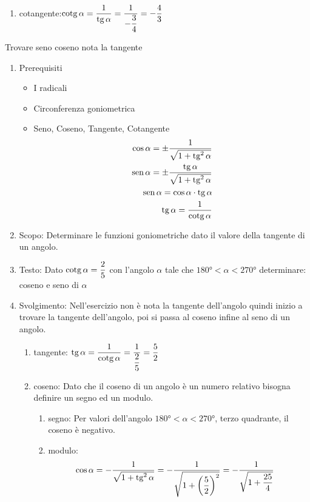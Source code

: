 {\begin{table}[H]
\begin{enumerate}
\begin{enumerate}
  \item cotangente:$\operatorname{cotg}\alpha=\dfrac{1}{\operatorname{tg}\alpha}=\dfrac{1}{-\dfrac{3}{4}}=-\dfrac{4}{3}$
\end{enumerate}
 \end{enumerate}
\end{table}
\begin{table}[H]
	\caption{Trovare seno coseno nota la tangente}
	\label{tab:sommadifangoli}
	\begin{enumerate}
		\item Prerequisiti 
		\begin{itemize}
			\item I radicali
			\item Circonferenza goniometrica
			\item Seno, Coseno, Tangente, Cotangente
			\begin {align*}
			\cos\alpha=\pm\dfrac{1}{\sqrt{1+\operatorname{tg}^2\alpha}}\\
			\operatorname{sen}\alpha=\pm\dfrac{\operatorname{tg}\alpha}{\sqrt{1+\operatorname{tg}^2\alpha}}\\
			\operatorname{sen}\alpha=\cos\alpha\cdot\operatorname{tg}\alpha\\
			\operatorname{tg}\alpha=\dfrac{1}{\operatorname{cotg}\alpha}
		\end{align*}
	\end{itemize}
	\item Scopo: Determinare le funzioni goniometriche dato il valore della tangente di un angolo.
	\item Testo: Dato $\operatorname{cotg}\alpha=\dfrac{2}{5}$ con l'angolo $\alpha$ tale che $\ang{180}<\alpha<\ang{270}$ determinare: coseno e seno di $\alpha$
	\item Svolgimento: Nell'esercizio non è nota la tangente dell'angolo quindi inizio a trovare la tangente dell'angolo, poi si passa al coseno infine al seno di un angolo.
	\begin{enumerate}
		\item tangente: $\operatorname{tg}\alpha=\dfrac{1}{\operatorname{cotg}\alpha}=\dfrac{1}{\dfrac{2}{5}}=\dfrac{5}{2}$
		\item coseno: Dato che il coseno di un angolo è un numero relativo bisogna definire un segno ed un modulo.
		\begin{enumerate}
			\item segno: Per valori dell'angolo  $\ang{180}<\alpha<\ang{270}$, terzo quadrante, il coseno è negativo. 
			\item modulo:
			\begin{align*}
			\cos\alpha&=-\dfrac{1}{\sqrt{1+\tg^2\alpha}}
			=-\dfrac{1}{\sqrt{1+\left(\dfrac{5}{2}\right)^2}}=-\dfrac{1}{\sqrt{1+\dfrac{25}{4}}}

\end{align*}
\end{enumerate}
\end{enumerate}
\end{enumerate}
\end{table}}
